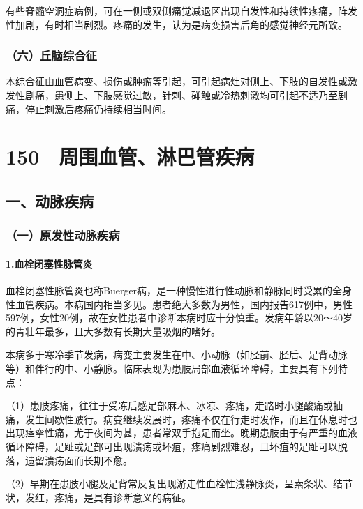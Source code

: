 有些脊髓空洞症病例，可在一侧或双侧痛觉减退区出现自发性和持续性疼痛，阵发性加剧，有时相当剧烈。疼痛的发生，认为是病变损害后角的感觉神经元所致。

\subsubsection{（六）丘脑综合征}

本综合征由血管病变、损伤或肿瘤等引起，可引起病灶对侧上、下肢的自发性或激发性剧痛，患侧上、下肢感觉过敏，针刺、碰触或冷热刺激均可引起不适乃至剧痛，停止刺激后疼痛仍持续相当时间。

\protect\hypertarget{text00341.html}{}{}

\section{150　周围血管、淋巴管疾病}

\subsection{一、动脉疾病}

\subsubsection{（一）原发性动脉疾病}

\paragraph{1.血栓闭塞性脉管炎}

血栓闭塞性脉管炎也称Buerger病，是一种慢性进行性动脉和静脉同时受累的全身性血管疾病。本病国内相当多见。患者绝大多数为男性，国内报告617例中，男性597例，女性20例，故在女性患者中诊断本病时应十分慎重。发病年龄以20～40岁的青壮年最多，且大多数有长期大量吸烟的嗜好。

本病多于寒冷季节发病，病变主要发生在中、小动脉（如胫前、胫后、足背动脉等）和伴行的中、小静脉。临床表现为患肢局部血液循环障碍，主要具有下列特点：

（1）患肢疼痛，往往于受冻后感足部麻木、冰凉、疼痛，走路时小腿酸痛或抽痛，发生间歇性跛行。病变继续发展时，疼痛不仅在行走时发作，而且在休息时也出现痉挛性痛，尤于夜间为甚，患者常双手抱足而坐。晚期患肢由于有严重的血液循环障碍，足趾或足部可出现溃疡或坏疽，疼痛剧烈难忍，且坏疽的足趾可以脱落，遗留溃疡面而长期不愈。

（2）早期在患肢小腿及足背常反复出现游走性血栓性浅静脉炎，呈索条状、结节状，发红，疼痛，是具有诊断意义的病征。


